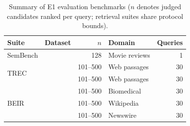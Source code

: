 \begin{table}[t]
  \centering\small
  \caption{Summary of E1 evaluation benchmarks ($n$ denotes judged candidates ranked per query; retrieval suites share protocol bounds).}
  \label{tab:datasets}
  \setlength{\tabcolsep}{3pt}
  \begin{tabular*}{\columnwidth}{@{\extracolsep{\fill}}llrlr@{}}
    \toprule
    Suite & Dataset & $n$ & Domain & Queries \\
    \midrule
    SemBench & \Qnine{} & 128 & Movie reviews & 1 \\
    \midrule
    \multirow{2}{*}{TREC} & \DLtwozero{} & 101--500 & Web passages & 30 \\
                          & \DLtwotwo{} & 101--500 & Web passages & 30 \\
    \midrule
    \multirow{3}{*}{BEIR} & \COVID{} & 101--500 & Biomedical & 30 \\
                         & \DBpedia{} & 101--500 & Wikipedia & 30 \\
                         & \RobustFour{} & 101--500 & Newswire & 30 \\
    \bottomrule
  \end{tabular*}
\end{table}
